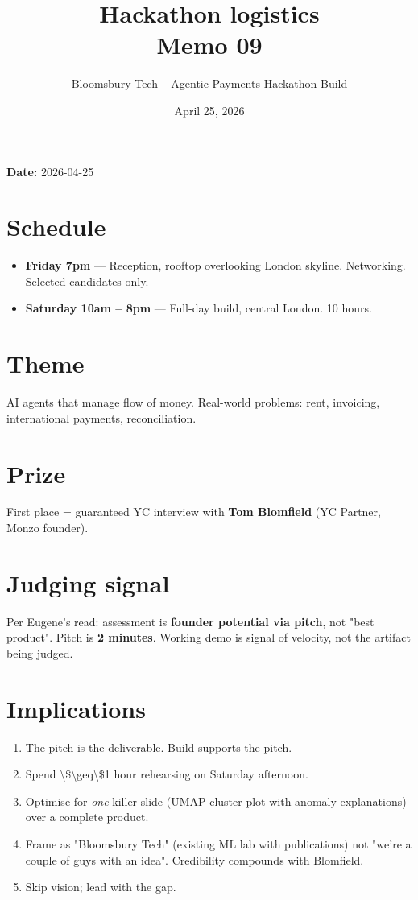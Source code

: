 \documentclass[11pt]{article}
\title{\textbf{Hackathon logistics}\\
\large Memo 09}
\author{Bloomsbury Tech -- Agentic Payments Hackathon Build}
\date{April 25, 2026}
\begin{document}
\maketitle

\textbf{Date:} 2026-04-25

\section{Schedule}
\begin{itemize}
  \item \textbf{Friday 7pm} --- Reception, rooftop overlooking London skyline. Networking. Selected candidates only.
  \item \textbf{Saturday 10am -- 8pm} --- Full-day build, central London. 10 hours.
\end{itemize}
\section{Theme}
AI agents that manage flow of money. Real-world problems: rent, invoicing, international payments, reconciliation.

\section{Prize}
First place = guaranteed YC interview with \textbf{Tom Blomfield} (YC Partner, Monzo founder).

\section{Judging signal}
Per Eugene's read: assessment is \textbf{founder potential via pitch}, not "best product". Pitch is \textbf{2 minutes}. Working demo is signal of velocity, not the artifact being judged.

\section{Implications}
\begin{enumerate}
  \item The pitch is the deliverable. Build supports the pitch.
  \item Spend \textbackslash{}\$\textbackslash{}geq\textbackslash{}\$1 hour rehearsing on Saturday afternoon.
  \item Optimise for \emph{one} killer slide (UMAP cluster plot with anomaly explanations) over a complete product.
  \item Frame as "Bloomsbury Tech" (existing ML lab with publications) not "we're a couple of guys with an idea". Credibility compounds with Blomfield.
  \item Skip vision; lead with the gap.
\end{enumerate}
\end{document}
